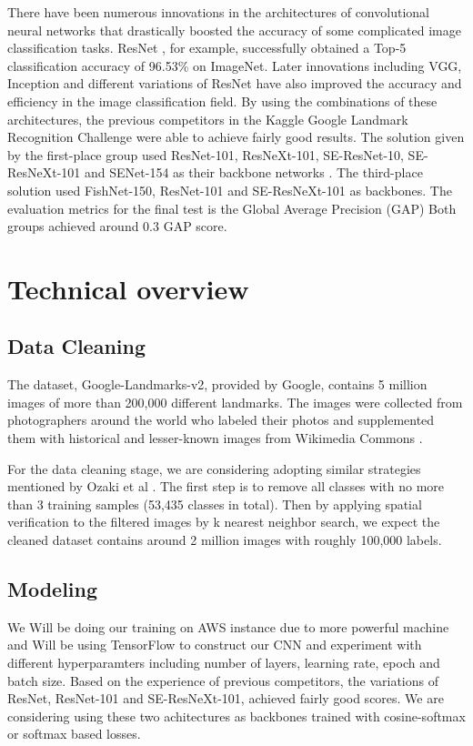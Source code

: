 \documentclass[10pt,twocolumn,letterpaper]{article}
\begin{document}
There have been numerous innovations in the architectures of convolutional neural networks that drastically boosted the accuracy of some complicated image classification tasks. ResNet \cite{He_2016}, for example, successfully obtained a Top-5 classification accuracy of 96.53\% on ImageNet. Later innovations including VGG, Inception and different variations of ResNet have also improved the accuracy and efficiency in the image classification field. By using the combinations of these architectures, the previous competitors in the Kaggle Google Landmark Recognition Challenge \cite{Kaggle} were able to achieve fairly good results. The solution given by the first-place group used ResNet-101, ResNeXt-101, SE-ResNet-10, SE-ResNeXt-101 and SENet-154 as their backbone networks \cite{gu2019team}. The third-place solution used FishNet-150, ResNet-101 and SE-ResNeXt-101 as backbones. The evaluation metrics for the final test is the Global Average Precision (GAP) \cite{Kaggle} Both groups achieved around 0.3 GAP score. 

\section{Technical overview}


\subsection{Data Cleaning}

The dataset, Google-Landmarks-v2, provided by Google, contains 5 million images of more than 200,000 different landmarks. The images were collected from photographers around the world who labeled their photos and supplemented them with historical and lesser-known images from Wikimedia Commons \cite{Noh_2017}.

For the data cleaning stage, we are considering adopting similar strategies mentioned by Ozaki et al \cite{Ozaki2019LargescaleLR}. The first step is to remove all classes with no more than 3 training samples (53,435 classes in total). Then by applying spatial verification to the filtered images by k nearest neighbor search, we expect the cleaned dataset contains around 2 million images with roughly 100,000 labels.

\subsection{Modeling}
We Will be doing our training on AWS instance due to more powerful machine and Will be using TensorFlow to construct our CNN and experiment with different hyperparamters including number of layers, learning rate, epoch and batch size. Based on the experience of previous competitors, the variations of ResNet, ResNet-101 and SE-ResNeXt-101, achieved fairly good scores. We are considering using these two achitectures as backbones trained with cosine-softmax or softmax based losses.
\end{document}
